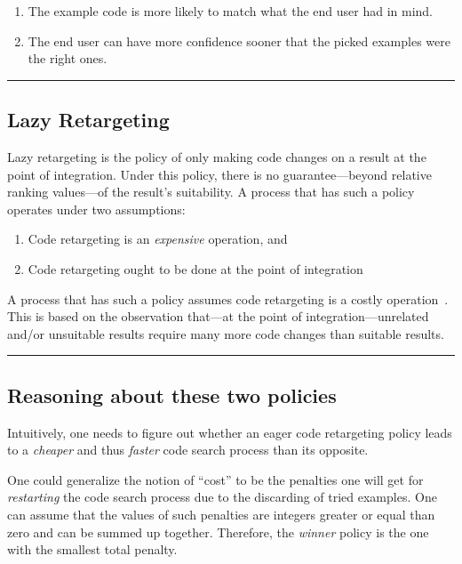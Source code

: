 \begin{enumerate}
	\item The example code is more likely to match what the end user had in mind.
	\item The end user can have more confidence sooner that the picked examples were the right ones.
\end{enumerate}


\fancybreak{\pfbreakdisplay}

\subsection{Lazy Retargeting}

Lazy retargeting is the policy of only making code changes on a result at the point of integration. Under this policy, there is no guarantee---beyond relative ranking values---of the result's suitability. A process that has such a policy operates under two assumptions:

\begin{enumerate}
	\item Code retargeting is an \emph{expensive} operation, and
	\item Code retargeting ought to be done at the point of integration
\end{enumerate}

A process that has such a policy assumes code retargeting is a costly operation~\cite{Brandt:2009ew, Wightman:2012gc}. This is based on the observation that---at the point of integration---unrelated and/or unsuitable results require many more code changes than suitable results.

\fancybreak{\pfbreakdisplay}

\subsection{Reasoning about these two policies}

Intuitively, one needs to figure out whether an eager code retargeting policy leads to a \emph{cheaper} and thus \emph{faster} code search process than its opposite. 

One could generalize the notion of ``cost'' to be the penalties one will get for \emph{restarting} the code search process due to the discarding of tried examples. One can assume that the values of such penalties are integers greater or equal than zero and can be summed up together. Therefore, the \emph{winner} policy is the one with the smallest total penalty.

